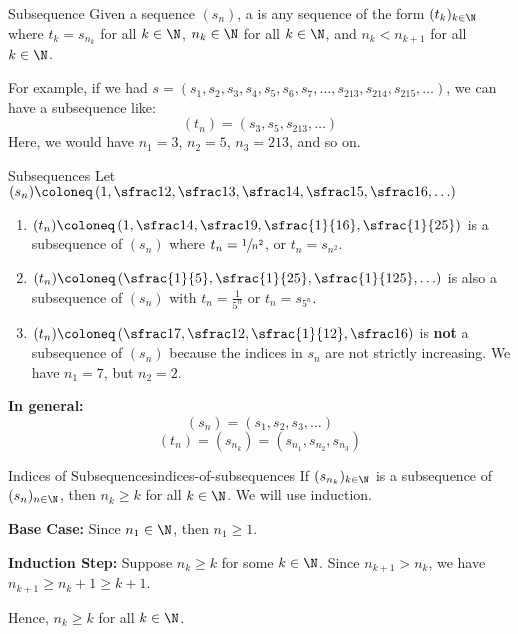 \begin{dfnbox}{Subsequence}{}
    Given a sequence $(s_n)$, a  is any sequence of the form $(t_k)_{k \in \N}$ where $t_k = s_{n_k}$ for all $k \in \N$, $n_k \in \N$ for all $k \in \N$, and $n_k < n_{k+1}$ for all $k \in \N$.
\end{dfnbox}

For example, if we had $s = (s_1, s_2, s_3, s_4, s_5, s_6, s_7, \ldots, s_{213}, s_{214}, s_{215}, \ldots)$, we can have a subsequence like:
\[ (t_n) = (s_3, s_5, s_{213}, \ldots) \]
Here, we would have $n_1 = 3$, $n_2 = 5$, $n_3 = 213$, and so on.

\begin{exbox}{Subsequences}{}
    Let $(s_n) \coloneq \left( 1, \sfrac12, \sfrac13, \sfrac14, \sfrac15, \sfrac16, \ldots \right)$
    \begin{enumerate}
        \item $(t_n) \coloneq \left( 1, \sfrac14, \sfrac19, \sfrac{1}{16}, \sfrac{1}{25} \right)$ is a subsequence of $(s_n)$ where $t_n = \sfrac{1}{n^2}$, or $t_n = s_{n^2}$.
        \item $(t_n) \coloneq \left( \sfrac{1}{5}, \sfrac{1}{25}, \sfrac{1}{125}, \ldots \right)$ is also a subsequence of $(s_n)$ with $t_n = \frac{1}{5^n}$ or $t_n = s_{5^n}$.
        \item $(t_n) \coloneq \left( \sfrac17, \sfrac12, \sfrac{1}{12}, \sfrac16 \right)$ is \textbf{not} a subsequence of $(s_n)$ because the indices in $s_n$ are not strictly increasing. We have $n_1 = 7$, but $n_2 = 2$.
    \end{enumerate}
\end{exbox}

\begin{notebox}
    \textbf{In general:}
    \[ (s_n) = (s_1, s_2, s_3, \ldots) \]
    \[ (t_n) = (s_{n_k}) = (s_{n_1}, s_{n_2}, s_{n_3}) \]
\end{notebox}

\begin{lembox}{Indices of Subsequences}{indices-of-subsequences}
    If $(s_{n_k})_{k \in \N}$ is a subsequence of $(s_n)_{n \in \N}$, then $n_k \geq k$ for all $k \in \N$.
    \tcblower
    We will use induction.

    \textbf{Base Case:} Since $n_1 \in \N$, then $n_1 \geq 1$.

    \textbf{Induction Step:} Suppose $n_k \geq k$ for some $k \in \N$. Since $n_{k+1} > n_k$, we have $n_{k+1} \geq n_k + 1 \geq k + 1$.

    Hence, $n_k \geq k$ for all $k \in \N$.
\end{lembox}

